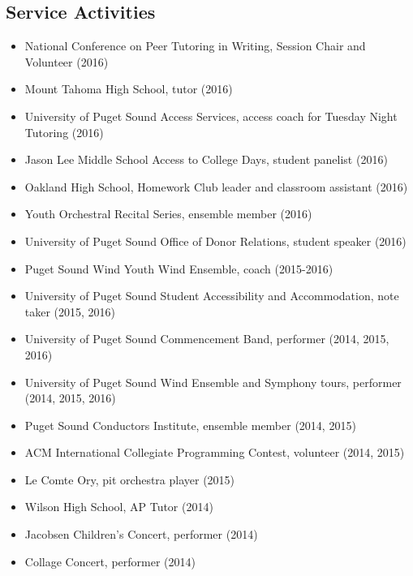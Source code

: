 \documentclass[letter]{res}
\begin{document}
\begin{resume}
\section{Service Activities}
\begin{itemize}
    \item National Conference on Peer Tutoring in Writing, Session Chair and Volunteer (2016)
  	\item Mount Tahoma High School, tutor (2016)
	\item University of Puget Sound Access Services, access coach for Tuesday Night Tutoring (2016)
    \item Jason Lee Middle School Access to College Days, student panelist (2016)
	\item Oakland High School, Homework Club leader and classroom assistant (2016)
	\item Youth Orchestral Recital Series, ensemble member (2016)
    \item University of Puget Sound Office of Donor Relations, student speaker (2016)
    \item Puget Sound Wind Youth Wind Ensemble, coach (2015-2016)
    \item University of Puget Sound Student Accessibility and Accommodation, note taker (2015, 2016)
    \item University of Puget Sound Commencement Band, performer (2014, 2015, 2016)
    \item University of Puget Sound Wind Ensemble and Symphony tours, performer (2014, 2015, 2016)
    \item Puget Sound Conductors Institute, ensemble member (2014, 2015)
    \item ACM International Collegiate Programming Contest, volunteer (2014, 2015)
    \item Le Comte Ory, pit orchestra player (2015)
    \item Wilson High School, AP Tutor (2014)
    \item Jacobsen Children's Concert, performer (2014)
    \item Collage Concert, performer (2014)

\end{itemize}
\vspace{-3.5mm}

\end{resume}
\end{document}
